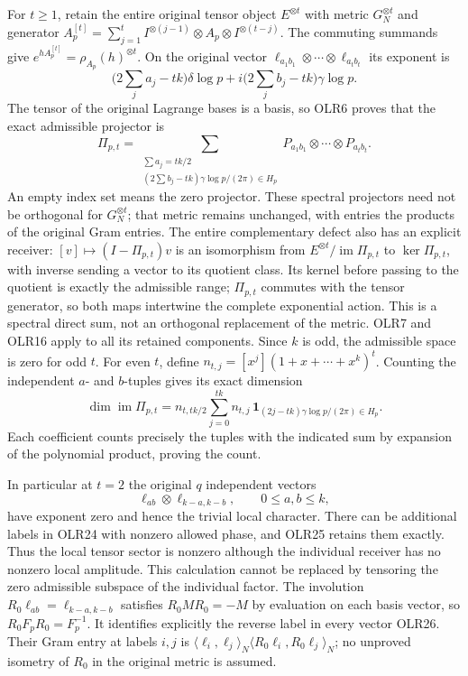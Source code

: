 For $t\ge1$, retain the entire original tensor object
$E^{\otimes t}$ with metric $G_N^{\otimes t}$ and generator
$A_p^{[t]}=\sum_{j=1}^tI^{\otimes(j-1)}\otimes A_p\otimes
I^{\otimes(t-j)}$.
The commuting summands give
$e^{hA_p^{[t]}}=\rho_{A_p}(h)^{\otimes t}$.
On the original vector
$\ell_{a_1b_1}\otimes\cdots\otimes\ell_{a_tb_t}$ its exponent is
\[
\bigl(2\textstyle\sum_j a_j-tk\bigr)\delta\log p
+i\bigl(2\textstyle\sum_j b_j-tk\bigr)\gamma\log p.
\tag{OLR23}
\]
The tensor of the original Lagrange bases is a basis, so OLR6
proves that the exact admissible projector is
\[
\Pi_{p,t}=\sum_{\substack{\sum a_j=tk/2\\
(2\sum b_j-tk)\gamma\log p/(2\pi)\in H_p}}
       P_{a_1b_1}\otimes\cdots\otimes P_{a_tb_t}.
\tag{OLR24}
\]
An empty index set means the zero projector. These spectral
projectors need not be orthogonal for $G_N^{\otimes t}$;
that metric remains unchanged, with entries the products of
the original Gram entries.
The entire complementary defect also has an explicit receiver:
$[v]\mapsto(I-\Pi_{p,t})v$ is an isomorphism from
$E^{\otimes t}/\operatorname{im}\Pi_{p,t}$ to
$\ker\Pi_{p,t}$, with inverse sending a vector to its quotient
class. Its kernel before passing to the quotient is exactly the
admissible range; $\Pi_{p,t}$ commutes with the tensor generator,
so both maps intertwine the complete exponential action.
This is a spectral direct sum, not an orthogonal replacement of
the metric. OLR7 and OLR16 apply to all its retained components.
Since $k$ is odd, the admissible space is zero for odd $t$.
For even $t$, define
$n_{t,j}=[x^j](1+x+\cdots+x^k)^t$.
Counting the independent $a$- and $b$-tuples gives its exact dimension
\[
\dim\operatorname{im}\Pi_{p,t}
=n_{t,tk/2}\sum_{j=0}^{tk}n_{t,j}\,
 \mathbf1_{(2j-tk)\gamma\log p/(2\pi)\in H_p}.
\tag{OLR25}
\]
Each coefficient counts precisely the tuples with the indicated
sum by expansion of the polynomial product, proving the count.

In particular at $t=2$ the original $q$ independent vectors
\[
\ell_{ab}\otimes\ell_{k-a,k-b},\qquad0\le a,b\le k,
\tag{OLR26}
\]
have exponent zero and hence the trivial local character.
There can be additional labels in OLR24 with nonzero allowed
phase, and OLR25 retains them exactly. Thus the local tensor
sector is nonzero although the individual receiver has no
nonzero local amplitude. This calculation cannot be replaced by
tensoring the zero admissible subspace of the individual factor.
The involution $R_0\ell_{ab}=\ell_{k-a,k-b}$ satisfies
$R_0MR_0=-M$ by evaluation on each basis vector, so
$R_0F_pR_0=F_p^{-1}$. It identifies explicitly the reverse label
in every vector OLR26. Their Gram entry at labels $i,j$ is
$\langle\ell_i,\ell_j\rangle_N
 \langle R_0\ell_i,R_0\ell_j\rangle_N$; no unproved isometry
of $R_0$ in the original metric is assumed.

